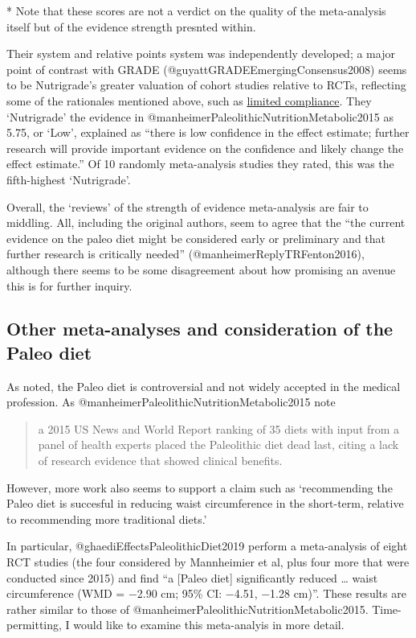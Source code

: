 \documentclass[]{article}
\begin{document}
* Note that these scores are not a verdict on the quality of the
meta-analysis itself but of the evidence strength presnted within.

Their system and relative points system was independently developed; a
major point of contrast with GRADE (@guyattGRADEEmergingConsensus2008)
seems to be Nutrigrade's greater valuation of cohort studies relative to
RCTs, reflecting some of the rationales mentioned above, such as
\protect\hyperlink{compliance}{limited compliance}. They `Nutrigrade'
the evidence in @manheimerPaleolithicNutritionMetabolic2015 as 5.75, or
`Low', explained as ``there is low confidence in the effect estimate;
further research will provide important evidence on the confidence and
likely change the effect estimate.'' Of 10 randomly meta-analysis
studies they rated, this was the fifth-highest `Nutrigrade'.

Overall, the `reviews' of the strength of evidence meta-analysis are
fair to middling. All, including the original authors, seem to agree
that the ``the current evidence on the paleo diet might be considered
early or preliminary and that further research is critically needed''
(@manheimerReplyTRFenton2016), although there seems to be some
disagreement about how promising an avenue this is for further inquiry.

\hypertarget{other-meta-analyses-and-consideration-of-the-paleo-diet}{%
\subsection{Other meta-analyses and consideration of the Paleo
diet}\label{other-meta-analyses-and-consideration-of-the-paleo-diet}}

As noted, the Paleo diet is controversial and not widely accepted in the
medical profession. As @manheimerPaleolithicNutritionMetabolic2015 note

\begin{quote}
a 2015 US News and World Report ranking of 35 diets with input from a
panel of health experts placed the Paleolithic diet dead last, citing a
lack of research evidence that showed clinical benefits.
\end{quote}

However, more work also seems to support a claim such as `recommending
the Paleo diet is succesful in reducing waist circumference in the
short-term, relative to recommending more traditional diets.'

In particular, @ghaediEffectsPaleolithicDiet2019 perform a meta-analysis
of eight RCT studies (the four considered by Mannheimier et al, plus
four more that were conducted since 2015) and find ``a {[}Paleo diet{]}
significantly reduced \ldots{} waist circumference (WMD = −2.90 cm; 95\%
CI: −4.51, −1.28 cm)''. These results are rather similar to those of
@manheimerPaleolithicNutritionMetabolic2015. Time-permitting, I would
like to examine this meta-analyis in more detail.
\end{document}
